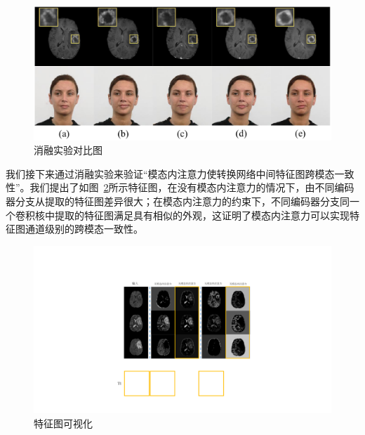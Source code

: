 \begin{figure}
	\begin{center}
		\includegraphics[width=0.8\columnwidth]{figures/JAGAN/ablation.pdf}
	\end{center}
	\caption{消融实验对比图}
	\label{fig:ablation}
\end{figure}

我们接下来通过消融实验来验证“模态内注意力使转换网络中间特征图跨模态一致性”。我们提出了如图~\ref{fig:ablation1}所示特征图，在没有模态内注意力的情况下，由不同编码器分支从提取的特征图差异很大；在模态内注意力的约束下，不同编码器分支同一个卷积核中提取的特征图满足具有相似的外观，这证明了模态内注意力可以实现特征图通道级别的跨模态一致性。

\begin{figure}
	\begin{center}
		\includegraphics[width=0.8\columnwidth]{figures/JAGAN/ablation1.pdf}
	\end{center}
	\caption{特征图可视化}
	\label{fig:ablation1}
\end{figure}


